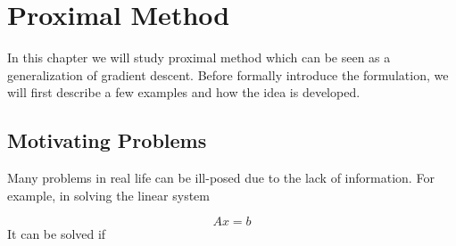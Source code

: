 \chapter{Proximal Method}
In this chapter we will study proximal method which can be seen as a generalization of gradient descent. Before formally introduce the formulation, we will first describe a few examples and how the idea is developed. 

\section{Motivating Problems}
Many problems in real life can be ill-posed due to the lack of information. For example, in solving the linear system

\begin{equation*}
    Ax = b
\end{equation*}
It can be solved if 